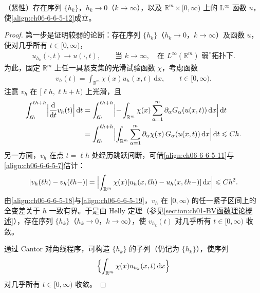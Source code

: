 \documentclass[../../main.tex]{subfiles}
\begin{document}
\begin{lemma}\label{lemma:ch06-6-5-3}
（紧性）存在序列 $\{h_{k}\}$，$h_{k}\to 0$（$k\to\infty$），以及 $\mathbb{R}^{m}\times[0,\infty)$ 上的 L$^{\infty}$ 函数 $u$，使\eqref{align:ch06-6-6-5-12}成立。
\end{lemma}

\begin{proof}
第一步是证明较弱的论断：存在序列 $\{h_{k}\}$（$h_{k}\to 0$，$k\to\infty$）及函数 $u$，使对几乎所有 $t\in[0,\infty)$，
\begin{align}
u_{h_{k}}(\cdot,t)\to u(\cdot,t),\qquad\text{当 }k\to\infty,\quad\text{在 }L^{\infty}(\mathbb{R}^{m})\text{ 弱$^{*}$拓扑下}.
\label{align:ch06-6-6-5-16}
\end{align}
为此，固定 $\mathbb{R}^{m}$ 上任一具紧支集的光滑试验函数 $\chi$，考虑函数
\begin{align}
v_{h}(t)=\int_{\mathbb{R}^{m}}\chi(x)u_{h}(x,t)\,\mathrm{d}x,\qquad t\in[0,\infty).
\label{align:ch06-6-6-5-17}
\end{align}
注意 $v_{h}$ 在 $[\ell h,\ell h+h)$ 上光滑，且
\begin{align}
\int_{\ell h}^{\ell h+h}\Bigl{|}\frac{\mathrm{d}}{\mathrm{d}t}v_{h}(t)\Bigr{|}\,\mathrm{d}t
&=\int_{\ell h}^{\ell h+h}\Bigl{|}-\int_{\mathbb{R}^{m}}\chi(x)\sum_{\alpha=1}^{m}\partial_{\alpha}G_{\alpha}(u(x,t))\,\mathrm{d}x\Bigr{|}\,\mathrm{d}t\notag\\
&=\int_{\ell h}^{\ell h+h}\Bigl{|}\int_{\mathbb{R}^{m}}\sum_{\alpha=1}^{m}\partial_{\alpha}\chi(x)\,G_{\alpha}(u(x,t))\,\mathrm{d}x\Bigr{|}\,\mathrm{d}t\leqslant Ch.
\label{align:ch06-6-6-5-18}
\end{align}
另一方面，$v_{h}$ 在点 $t=\ell h$ 处经历跳跃间断，可借\eqref{align:ch06-6-6-5-11}与\eqref{align:ch06-6-6-5-7}估计：
\begin{align}
|v_{h}(\ell h)-v_{h}(\ell h-)|=\Bigl{|}\int_{\mathbb{R}^{m}}\chi(x)[u_{h}(x,\ell h)-u_{h}(x,\ell h-)]\,\mathrm{d}x\Bigr{|}\leqslant Ch^{2}.
\label{align:ch06-6-6-5-19}
\end{align}
由\eqref{align:ch06-6-6-5-18}与\eqref{align:ch06-6-6-5-19}，$v_{h}$ 在 $[0,\infty)$ 的任一紧子区间上的全变差关于 $h$ 一致有界。于是由 Helly 定理（参见\cref{section:ch01-BV函数理论概述}），存在序列 $\{h_{k}\}$（$h_{k}\to 0$，$k\to\infty$），使 $v_{h_{k}}(t)$ 对几乎所有 $t\in[0,\infty)$ 收敛。


通过 Cantor 对角线程序，可构造 $\{h_{k}\}$ 的子列（仍记为 $\{h_{k}\}$），使序列
\begin{align}
\Bigl{\{}\int_{\mathbb{R}^{m}}\chi(x)u_{h_{k}}(x,t)\,\mathrm{d}x\Bigr{\}}
\label{align:ch06-6-6-5-20}
\end{align}
对几乎所有 $t\in[0,\infty)$ 收敛。
\end{proof}
\end{document}
